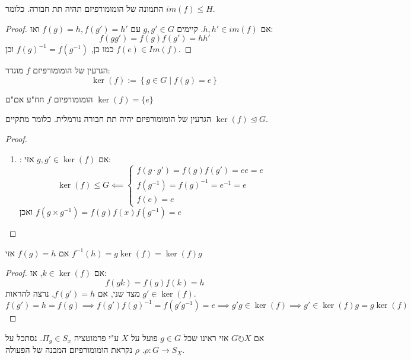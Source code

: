 \documentclass{tstextbook}
\begin{document}
\begin{proposition}
התמונה של הומומורפיזם תהיה תת חבורה. כלומר \(im(f)\leq H\).

\end{proposition}
\begin{proof}
אם \(h,h'\in im(f)\). קיימים \(g,g'\in G\) עם \(f(g)=h,f(g')=h'\) ואז: $$f(gg')=f(g)f(g')=hh'$$ כמו כן, \(f(g)^{-1} =f(g^{-1} )\) וכן \(f(e)\in Im(f)\).

\end{proof}
\begin{definition}
הגרעין של הומומורפיזם \(f\) מוגדר:
 $$\ker(f):=\left\{  g\in G\;|\;f(g)=e  \right\}$$

\end{definition}
\begin{proposition}
הומומורפיזם \(f\) חח"ע אם"ם \(\ker(f)=\{ e \}\)

\end{proposition}
\begin{proposition}
הגרעין של הומומורפיזם יהיה תת חבורה נורמלית. כלומר מתקיים \(\ker(f) \trianglelefteq G\).

\end{proposition}
\begin{proof}
  \begin{enumerate}
    \item : אם \(g,g'\in \ker(f)\) אזי: 
$$\ker(f)\leq G \impliedby  \begin{cases}f\left( g\cdot g' \right)=f(g)f(g') = ee=e \\f(g^{-1} )=f(g)^{-1} =e^{-1} =e \\f(e)=e
\end{cases}$$
ואכן \(f\left( g\times g^{-1}  \right)=f(g)f(x)f(g^{-1} )=e\)
  \end{enumerate}
\end{proof}
\begin{proposition}
אם \(f(g)=h\) אזי \(f^{-1} (h)=g\ker(f)=\ker(f)g\)

\end{proposition}
\begin{proof}
אם \(k\in \ker(f)\), אז: $$f(gk)=f(g)f(k)=h$$ מצד שני, אם \(f(g')=h\), נרצה להראות \(g'\in \ker(f)\).
$$f(g')=h=f(g)\implies f(g')f(g)^{-1} = f(g'g^{-1} )=e\implies g'g\in \ker(f)\implies g'\in \ker(f)g=g\ker(f)$$

\end{proof}
\begin{definition}
אם \(G\circlearrowright X\) אזי ראינו שכל \(g\in G\) פועל על \(X\) ע"י פרמוטציה \(\Pi_{g}\in S_{x}\). נסתכל על \(\rho:G\to S_{X}\). \(\rho\) נקראת הומומורפיזם המבנה של הפעולה.

\end{definition}
\end{document}
